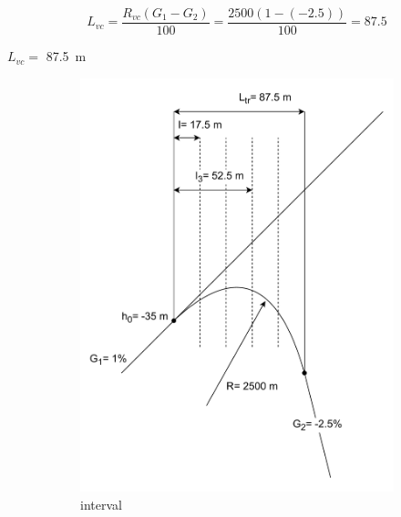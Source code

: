 \documentclass{bcrre_exam}
\begin{document}
\begin{equation}
    L_{vc} = \frac{R_{vc}(G_1-G_2)}{100}=\frac{2500(1-(-2.5))}{100}=87.5
\end{equation}

$L_{vc}=$ \qty{87.5}{m}

\begin{figure}[p]
    \centering
    \begin{subfigure}[b]{0.48\textwidth}
        \centering
        \includegraphics[width=\textwidth]{images/track-alignment-worksheet-vertical-curve-intervals.drawio.pdf}
        \caption{interval}
        \label{fig:vertical-curve-interval}
    \end{subfigure}
    \hfill
    \begin{subfigure}[b]{0.48\textwidth}
        \centering

\end{subfigure}
\end{figure}
\end{document}

